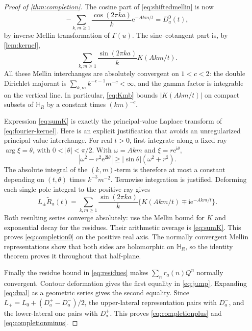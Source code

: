 \documentclass[11pt,a4paper]{article}
\numberwithin{equation}{section}
\theoremstyle{definition}
\theoremstyle{remark}
\newcommand{\ii}{\mathrm i}
\newcommand{\e}{\mathrm e}
\newcommand{\wt}{\widetilde}
\begin{document}
\begin{proof}[Proof of \cref{thm:completion}]
The cosine part of \eqref{eq:shiftedmellin} is now
\[
 -\sum_{k,m\geq1}\frac{\cos(2\pi ka)}k\e^{-Akm/t}=D_a^0(t),
\]
by inverse Mellin transformation of $\Gamma(u)$. The sine--cotangent
part is, by \cref{lem:kernel},
\begin{equation}
 \sum_{k,m\geq1}\frac{\sin(2\pi ka)}k K(Akm/t).
 \label{eq:sumK}
\end{equation}
All these Mellin interchanges are absolutely convergent on
$1<c<2$: the double Dirichlet majorant is
$\sum_{k,m}k^{-c-1}m^{-c}<\infty$, and the gamma factor is integrable
on the vertical line. In particular, \eqref{eq:Kmb} bounds
$|K(Akm/t)|$ on compact subsets of $\mathbb H_R$ by a constant times
$(km)^{-c}$.

Expression \eqref{eq:sumK} is exactly the principal-value Laplace
transform of \eqref{eq:fourier-kernel}. Here is an explicit justification
that avoids an unregularized principal-value interchange. For real
$t>0$, first integrate along a fixed ray $\arg\xi=\theta$, with
$0<|\theta|<\pi/2$. With $\omega=Akm$ and $\xi=r\e^{\ii\theta}$,
\[
 |\omega^2-r^2\e^{2\ii\theta}|
 \geq |\sin\theta|(\omega^2+r^2).
\]
The absolute integral of the $(k,m)$-term is therefore at most a
constant depending on $(t,\theta)$ times $k^{-3}m^{-2}$. Termwise
integration is justified. Deforming each single-pole integral to the
positive ray gives
\[
 L_\pm\wt R_a(t)=\sum_{k,m\geq1}\frac{\sin(2\pi ka)}k
       \{K(Akm/t)\mp\ii\e^{-Akm/t}\}.
\]
Both resulting series converge absolutely: use the Mellin bound for
$K$ and exponential decay for the residues. Their arithmetic average
is \eqref{eq:sumK}. This proves \eqref{eq:completion0} on the positive
real axis.
The normally convergent Mellin representations show that both sides
are holomorphic on $\mathbb H_R$, so the identity theorem proves it
throughout that half-plane.

Finally the residue bound in \eqref{eq:residues} makes
$\sum_nr_a(n)Q^n$ normally convergent. Contour deformation gives the
first equality in \eqref{eq:jump}. Expanding \eqref{eq:dual} as a
geometric series gives the second equality. Since
$L_+=L_0+(D_a^+-D_a^-)/2$, the upper-lateral representation pairs with
$D_a^-$, and the lower-lateral one pairs with $D_a^+$. This proves
\eqref{eq:completionplus} and \eqref{eq:completionminus}.
\end{proof}
\end{document}
